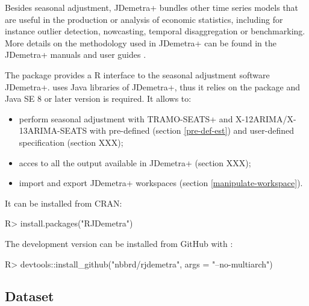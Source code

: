 \documentclass[article]{jss}
\providecommand{\tightlist}{%
  \setlength{\itemsep}{0pt}\setlength{\parskip}{0pt}}
\begin{document}
Besides seasonal adjustment, JDemetra+ bundles other time series models
that are useful in the production or analysis of economic statistics,
including for instance outlier detection, nowcasting, temporal
disaggregation or benchmarking. More details on the methodology used in
JDemetra+ can be found in the JDemetra+ manuals and user guides
\citep{grudkowska2015jdemetrarm, grudkowska2015jdemetraug}.

The package  provides a R interface to the seasonal
adjustment software JDemetra+.  uses Java libraries of
JDemetra+, thus it relies on the  \citep{rJava} package and
Java SE 8 or later version is required. It allows to:

\begin{itemize}
\tightlist
\item
  perform seasonal adjustment with TRAMO-SEATS+ and
  X-12ARIMA/X-13ARIMA-SEATS with pre-defined (section \ref{pre-def-est})
  and user-defined specification (section XXX);\\
\item
  acces to all the output available in JDemetra+ (section XXX);\\
\item
  import and export JDemetra+ workspaces (section
  \ref{manipulate-workspace}).
\end{itemize}

It can be installed from CRAN:

\begin{CodeChunk}

\begin{CodeInput}
R> install.packages("RJDemetra")
\end{CodeInput}
\end{CodeChunk}

The development version can be installed from GitHub with 
\citep{devtools}:

\begin{CodeChunk}

\begin{CodeInput}
R> devtools::install_github("nbbrd/rjdemetra", args = "--no-multiarch")
\end{CodeInput}
\end{CodeChunk}

\hypertarget{dataset}{%
\subsection{Dataset}\label{dataset}}
\end{document}

